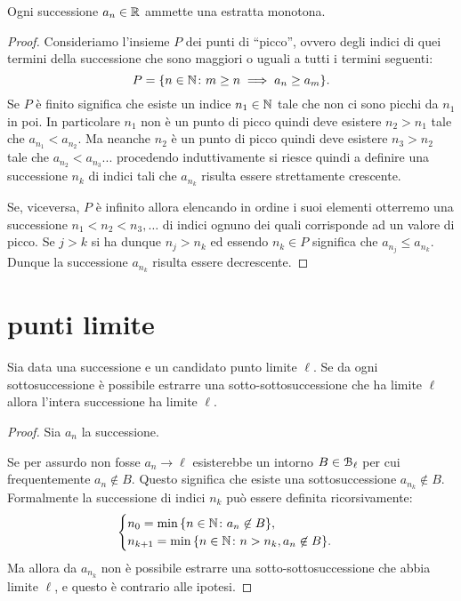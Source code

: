 \begin{lemma}
Ogni successione $a_n\in \mathbb R$ ammette una estratta monotona.
\end{lemma}
%
\begin{proof}
Consideriamo l'insieme $P$ dei punti di ``picco'', ovvero degli indici
di quei termini della successione che sono maggiori o uguali a tutti i termini
seguenti:
\[
  P = {\left\{ n\in \mathbb N\colon m\ge n \implies a_n\ge a_m \right\}}.
\]
Se $P$ è finito significa che esiste un indice $n_1\in \mathbb N$ tale
che non ci sono picchi da $n_1$ in poi. In particolare $n_1$ non è un punto di
picco
quindi deve esistere $n_2>n_1$ tale che $a_{n_1}<a_{n_2}$.
Ma neanche $n_2$ è un punto di picco quindi deve esistere $n_3>n_2$ tale
che $a_{n_2}<a_{n_3}$... procedendo induttivamente si riesce quindi a definire
una successione $n_k$ di indici tali che $a_{n_k}$ risulta essere strettamente
crescente.

Se, viceversa, $P$ è infinito allora elencando in ordine i suoi elementi otterremo
una successione $n_1 < n_2 < n_3, \dots$ di indici ognuno dei quali corrisponde ad un valore
di picco. Se $j>k$ si ha dunque $n_j>n_k$ ed essendo $n_k\in P$ significa che
$a_{n_j} \le a_{n_k}$. Dunque la successione $a_{n_k}$ risulta essere decrescente.
\end{proof}


\section{punti limite}

\begin{proposition}
  \label{prop:convergenza}
Sia data una successione e un candidato punto limite $\ell$.
Se da ogni sottosuccessione è possibile estrarre una sotto-sottosuccessione
che ha limite $\ell$ allora l'intera successione ha limite $\ell$.
\end{proposition}
%
\begin{proof}
  Sia $a_n$ la successione.

  Se per assurdo non fosse $a_n \to \ell$
  esisterebbe un intorno $B\in \mathcal B_\ell$
  per cui frequentemente $a_n \not \in B$.
  Questo significa che esiste una sottosuccessione
  $a_{n_k} \not \in B$. Formalmente
  la successione di indici $n_k$ può essere definita
  ricorsivamente:
  \[
    \begin{cases}
      n_0 = \min {\left\{ n\in \mathbb N\colon a_n \not \in B \right\}}, \\
      n_{k+1} = \min {\left\{ n\in \mathbb N\colon n>n_k, a_n \not \in B \right\}}.
    \end{cases}
  \]
  Ma allora da $a_{n_k}$
  non è possibile estrarre una sotto-sottosuccessione
  che abbia limite $\ell$, e questo è contrario alle
  ipotesi.
\end{proof}

